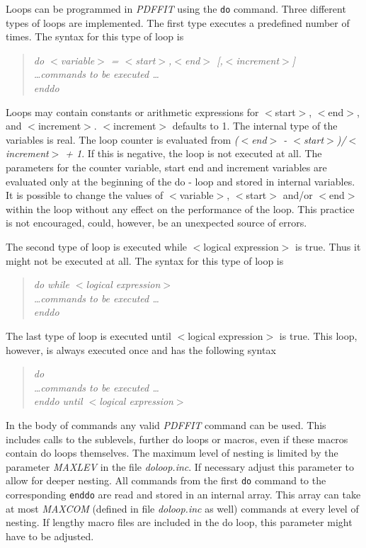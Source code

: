 Loops can be programmed in {\it PDFFIT} using the {\tt do} command.
Three different types of loops are implemented. The first type
executes a predefined number of times. The syntax for this type of
loop is

\begin{quote}
{\it do $<$variable$>$ = $<$start$>$,$<$end$>$ [,$<$increment$>$] \\
     \ldots commands to be executed \ldots \\
     enddo }
\end{quote}

Loops may contain constants or arithmetic expressions for $<$start$>$,
$<$end$>$, and $<$increment$>$.  $<$increment$>$ defaults to 1.  The
internal type of the variables is real.  The loop counter is evaluated from
{\it ($<$end$>$ - $<$start$>$)/$<$increment$>$ + 1}. If this is negative,
the loop is not executed at all.  The parameters for the counter variable,
start end and increment variables are evaluated only at the beginning of
the do - loop and stored in internal variables.  It is possible to change
the values of $<$variable$>$, $<$start$>$ and/or $<$end$>$ within the loop
without any effect on the performance of the loop.  This practice is not
encouraged, could, however, be an unexpected source of errors. \par

The second type of loop is executed while $<$logical expression$>$ is
true. Thus it might not be executed at all. The syntax for this type
of loop is

\begin{quote}
{\it do while $<$logical expression$>$ \\
     \ldots commands to be executed \ldots \\
     enddo }
\end{quote}

The last type of loop is executed until $<$logical expression$>$ is
true. This loop, however, is always executed once and has the
following syntax

\begin{quote}
{\it do \\
     \ldots commands to be executed \ldots \\
     enddo until $<$logical expression$>$ }
\end{quote}

In the body of commands any valid {\it PDFFIT} command can be used.
This includes calls to the sublevels, further do loops or macros,
even if these macros contain do loops themselves.  The maximum level
of nesting is limited by the parameter {\it MAXLEV} in the file {\it
doloop.inc}.  If necessary adjust this parameter to allow for deeper
nesting.  All commands from the first {\tt do} command to the
corresponding {\tt enddo} are read and stored in an internal array.
This array can take at most {\it MAXCOM} (defined in file {\it
doloop.inc} as well) commands at every level of nesting.  If lengthy
macro files are included in the do loop, this parameter might have
to be adjusted.  \par

